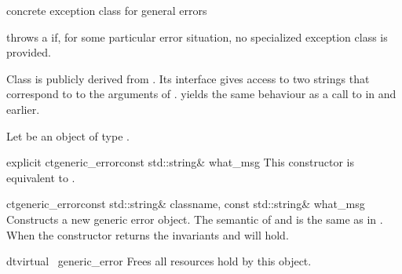 

\NAME

 \dotfill concrete exception class for general errors



\ABSTRACT

\LiDIA throws a  if, for some particular error situation,
no specialized exception class is provided.


\DESCRIPTION

Class  is publicly derived from . Its
interface gives access to two strings that correspond to to the arguments of
. 
 yields the same behaviour as a call to
 in  and earlier.

Let  be an object of type .
 

\CONS

\begin{fcode}{explicit ct}{generic_error}{const std::string& what_msg}
  This constructor is equivalent to
  .
\end{fcode}

\begin{fcode}{ct}{generic_error}{const std::string& classname, 
                                 const std::string& what_msg}
  Constructs a new generic error object. The semantic of  and
   is the same as in . When the
  constructor returns the invariants  and  will hold.
\end{fcode}

\begin{fcode}{dt}{virtual ~generic_error}{}
  Frees all resources hold by this object.
\end{fcode}

